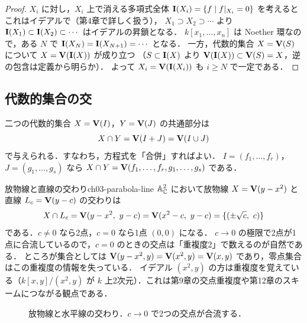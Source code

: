\begin{proof}
$X_i$ に対し，$X_i$ 上で消える多項式全体 $\mathbf{I}(X_i)=\{f\mid f|_{X_i}=0\}$ を考えるとこれはイデアルで（第4章で詳しく扱う），
$X_1\supset X_2\supset\cdots$ より $\mathbf{I}(X_1)\subset\mathbf{I}(X_2)\subset\cdots$ はイデアルの昇鎖となる．
$k[x_1,\dots,x_n]$ は Noether 環なので，ある $N$ で $\mathbf{I}(X_N)=\mathbf{I}(X_{N+1})=\cdots$ となる．
一方，代数的集合 $X=\mathbf{V}(S)$ について $X=\mathbf{V}(\mathbf{I}(X))$ が成り立つ
（$S\subset\mathbf{I}(X)$ より $\mathbf{V}(\mathbf{I}(X))\subset\mathbf{V}(S)=X$，逆の包含は定義から明らか）．
よって $X_i=\mathbf{V}(\mathbf{I}(X_i))$ も $i\ge N$ で一定である．
\end{proof}

\subsection{代数的集合の交}

二つの代数的集合 $X=\mathbf{V}(I)$，$Y=\mathbf{V}(J)$ の共通部分は
\[
  X\cap Y=\mathbf{V}(I+J)=\mathbf{V}(I\cup J)
\]
で与えられる．すなわち，方程式を「合併」すればよい．
$I=(f_1,\dots,f_r)$，$J=(g_1,\dots,g_s)$ なら $X\cap Y=\mathbf{V}(f_1,\dots,f_r,g_1,\dots,g_s)$ である．

\begin{myex}{放物線と直線の交わり}{ch03-parabola-line}
$\mathbb{A}^2_{\mathbb{C}}$ において放物線 $X=\mathbf{V}(y-x^2)$ と直線 $L_c=\mathbf{V}(y-c)$ の交わりは
\[
  X\cap L_c=\Zero(y-x^2,\ y-c)=\Zero(x^2-c,\ y-c)=\{(\pm\sqrt c,\ c)\}
\]
である．$c\ne0$ なら2点，$c=0$ なら1点 $(0,0)$ になる．
$c\to0$ の極限で2点が1点に合流しているので，$c=0$ のときの交点は「重複度2」で数えるのが自然である．
ところが集合としては $\mathbf{V}(y-x^2,y)=\mathbf{V}(x^2,y)=\mathbf{V}(x,y)$ であり，零点集合はこの重複度の情報を失っている．
イデアル $(x^2,y)$ の方は重複度を覚えている（$k[x,y]/(x^2,y)$ が $k$ 上2次元）．これは第9章の交点重複度や第12章のスキームにつながる観点である．
\end{myex}

\begin{figure}[H]
\centering
{}
\caption{放物線と水平線の交わり．$c\to0$ で2つの交点が合流する．}
\label{fig:ch03-parabola-line}
\end{figure}

